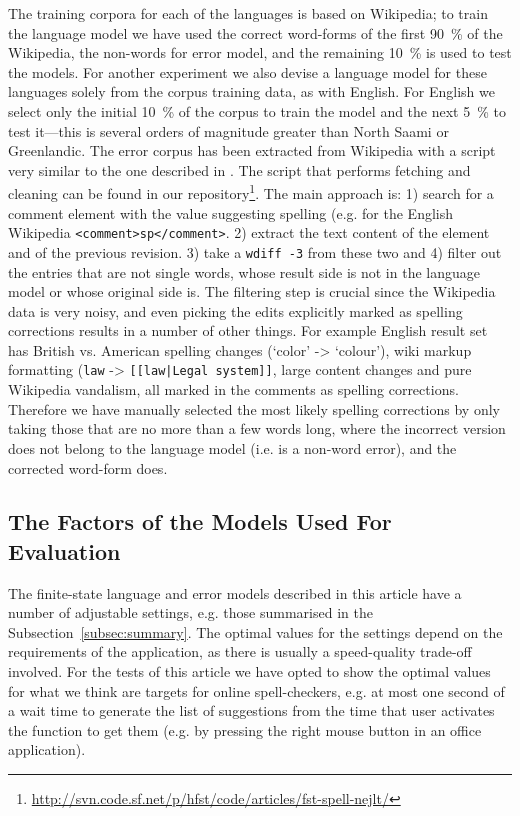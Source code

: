 \documentclass[a4paper,12pt]{article}
\begin{document}
The training corpora for each of the languages is based on Wikipedia; to train
the language model we have used the correct word-forms of the first 90~\% of
the Wikipedia, the non-words for error model, and the remaining 10~\% is used
to test the models. For another experiment we also devise a language model for
these languages solely from the corpus training data, as with English.  For
English we select only the initial 10~\% of the corpus to train the model and
the next 5~\% to test it---this is several orders of magnitude greater than
North Saami or Greenlandic. The error corpus has been extracted from Wikipedia
with a script very similar to the one described in \cite{max2010mining}. The
script that performs fetching and cleaning can be found in our
repository\footnote{\url{http://svn.code.sf.net/p/hfst/code/articles/fst-spell-nejlt/}}. The main approach is: 1) search for a comment
element with the value suggesting spelling (e.g. for the English Wikipedia
\texttt{<comment>sp</comment>}. 2) extract the text content of the element and
of the previous revision. 3) take a \texttt{wdiff -3} from these two and 4)
filter out the entries that are not single words, whose result side is not in
the language model or whose original side is.  The filtering step is crucial
since the Wikipedia data is very noisy, and even picking the edits explicitly
marked as spelling corrections results in a number of other things. For example
English result set has British vs.  American spelling changes (`color' ->
`colour'), wiki markup formatting (\texttt{law} -> \texttt{[[law|Legal
system]]}, large content changes and pure Wikipedia vandalism, all marked in
the comments as spelling corrections. Therefore we have manually selected the
most likely spelling corrections by only taking those that are no more than a
few words long, where the incorrect version does not belong to the language
model (i.e.  is a non-word error), and the corrected word-form does.

\subsection{The Factors of the Models Used For Evaluation}
\label{subsec:factors}

The finite-state language and error models described in this article have a
number of adjustable settings, e.g. those summarised in the
Subsection~\ref{subsec:summary}. The optimal values for the settings depend on
the requirements of the application, as there is usually a speed-quality
trade-off involved. For the tests of this article we have opted to show the
optimal values for what we think are targets for online spell-checkers, e.g. at
most one second of a wait time to generate the list of suggestions from the
time that user activates the function to get them (e.g. by pressing the right
mouse button in an office application).
\end{document}
